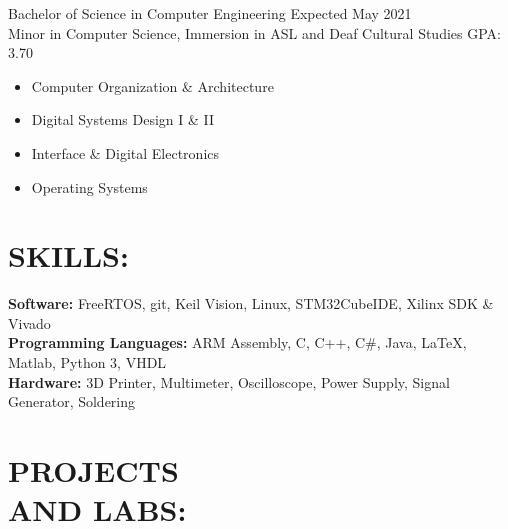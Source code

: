 \documentclass[line,margin]{res}
\newcommand{\SECTIONOFFSET}{-3.6pt}
\newcommand{\ITEMOFFSET}{-8pt}
\begin{document}
\begin{resume}
		Bachelor of Science in Computer Engineering \hfill Expected May 2021\\ 
		Minor in Computer Science, Immersion in ASL and Deaf Cultural Studies \hfill GPA: 3.70

		\begin{multicols}{2}
			\setlength\columnsep{1pt}
			\begin{itemize}
				\setlength{\itemindent}{-10pt}
				\item[] Computer Organization \& Architecture
				\item[] Digital Systems Design I \& II
				\item[] \hspace{16pt} Interface \& Digital Electronics
				\item[] \hspace{16pt} Operating Systems
			\end{itemize}
		\end{multicols}

		\vspace{\SECTIONOFFSET}

	\section{SKILLS:}

		\textbf{Software:} FreeRTOS, git, Keil \si{\micro}\hspace{-.5pt}Vision, Linux, STM32CubeIDE, Xilinx SDK \& Vivado\\
		\textbf{Programming Languages:} ARM Assembly, C, C++, C\#, Java, \LaTeX, Matlab, Python 3, VHDL \\
		\textbf{Hardware:} 3D Printer, Multimeter, Oscilloscope, Power Supply, Signal Generator, Soldering

		\vspace{\SECTIONOFFSET}

	\section{PROJECTS \\AND LABS:}



\end{resume}
\end{document}
